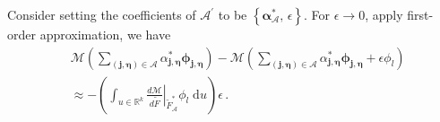 Consider setting the coefficients of $\mathcal{A}^\prime$ to be
$\left\{  \boldsymbol{\alpha}^*_{\mathcal{A}}, \, \epsilon  \right\}$.
For $\epsilon\rightarrow 0$, apply first-order approximation, we have
\begin{equation}\begin{split}
    & \mathcal{M} \left( 
    \sum_{(\boldsymbol{j}, \boldsymbol{\eta}) \in \mathcal{A}}
    \alpha^*_{\boldsymbol{j}, \boldsymbol{\eta}} \boldsymbol{\phi}_{\boldsymbol{j}, \boldsymbol{\eta}}
    \right)
    - \mathcal{M} \left( 
    \sum_{(\boldsymbol{j}, \boldsymbol{\eta}) \in \mathcal{A}}
    {\alpha}^*_{\boldsymbol{j}, \boldsymbol{\eta}} 
    \boldsymbol{\phi}_{\boldsymbol{j}, \boldsymbol{\eta}}
    + \epsilon \phi_l
    \right)   \\
    &\approx -\left(\int_{u\in \mathbb{R}^k} \left.\frac{d\mathcal{M}}{d \tilde{F}}
    \right|_{\tilde{F}_\mathcal{A}^*} \phi_l
    \; \textrm{d} u \right) \epsilon \,.
    \label{eqn: epsilon mismatch}
\end{split}\end{equation}
